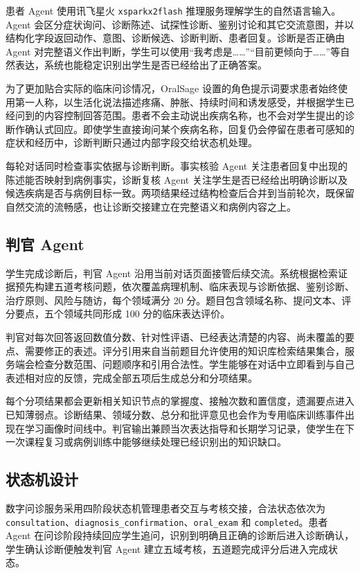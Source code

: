 患者 Agent 使用讯飞星火 \texttt{xsparkx2flash} 推理服务理解学生的自然语言输入。Agent 会区分症状询问、诊断陈述、试探性诊断、鉴别讨论和其它交流意图，并以结构化字段返回动作、意图、诊断候选、诊断判断、患者回复。诊断是否正确由 Agent 对完整语义作出判断，学生可以使用“我考虑是……”“目前更倾向于……”等自然表达，系统也能稳定识别出学生是否已经给出了正确答案。

为了更加贴合实际的临床问诊情况，OralSage 设置的角色提示词要求患者始终使用第一人称，以生活化说法描述疼痛、肿胀、持续时间和诱发感受，并根据学生已经问到的内容控制回答范围。患者不会主动说出疾病名称，也不会对学生提出的诊断作确认式回应。即使学生直接询问某个疾病名称，回复仍会停留在患者可感知的症状和经历中，诊断判断只通过内部字段交给状态机处理。

每轮对话同时检查事实依据与诊断判断。事实核验 Agent 关注患者回复中出现的陈述能否映射到病例事实，诊断复核 Agent 关注学生是否已经给出明确诊断以及候选疾病是否与病例目标一致。两项结果经过结构检查后合并到当前轮次，既保留自然交流的流畅感，也让诊断交接建立在完整语义和病例内容之上。

\subsection{判官 Agent}

学生完成诊断后，判官 Agent 沿用当前对话页面接管后续交流。系统根据检索证据预先构建五道考核问题，依次覆盖病理机制、临床表现与诊断依据、鉴别诊断、治疗原则、风险与随访，每个领域满分 20 分。题目包含领域名称、提问文本、评分要点，五个领域共同形成 100 分的临床表达评价。

判官对每次回答返回数值分数、针对性评语、已经表达清楚的内容、尚未覆盖的要点、需要修正的表述。评分引用来自当前题目允许使用的知识库检索结果集合，服务端会检查分数范围、问题顺序和引用合法性。学生能够在对话中立即看到与自己表述相对应的反馈，完成全部五项后生成总分和分项结果。

每个分项结果都会更新相关知识节点的掌握度、接触次数和置信度，遗漏要点进入已知薄弱点。诊断结果、领域分数、总分和批评意见也会作为专用临床训练事件出现在学习画像时间线中。判官输出兼顾当次表达指导和长期学习记录，使学生在下一次课程复习或病例训练中能够继续处理已经识别出的知识缺口。

\subsection{状态机设计}

数字问诊服务采用四阶段状态机管理患者交互与考核交接，合法状态依次为 \texttt{consultation}、\texttt{diagnosis\_confirmation}、\texttt{oral\_exam} 和 \texttt{completed}。患者 Agent 在问诊阶段持续回应学生追问，识别到明确且正确的诊断后进入诊断确认，学生确认诊断便触发判官 Agent 建立五域考核，五道题完成评分后进入完成状态。

